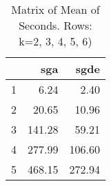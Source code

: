 \begin{table}[ht]
\centering
\begin{tabular}{rrr}
  \hline
 & sga & sgde \\ 
  \hline
1 & 6.24 & 2.40 \\ 
  2 & 20.65 & 10.96 \\ 
  3 & 141.28 & 59.21 \\ 
  4 & 277.99 & 106.60 \\ 
  5 & 468.15 & 272.94 \\ 
   \hline
\end{tabular}
\caption{Matrix of Mean of Seconds.  Rows: k=2, 3, 4, 5, 6)} 
\end{table}

